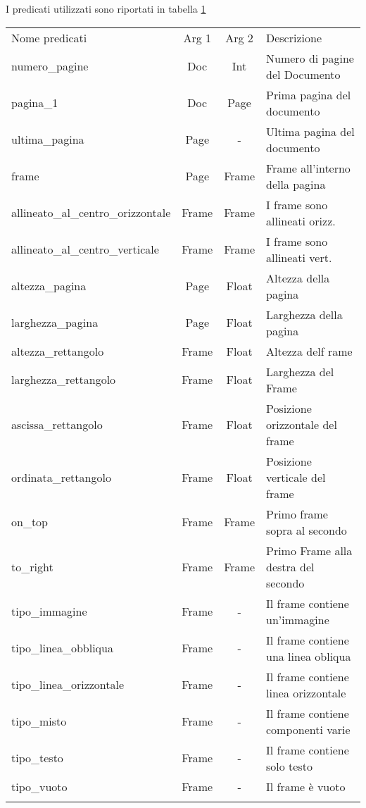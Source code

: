 I predicati utilizzati sono riportati in tabella \ref{tab:predicati}
\begin{table}[htbp]
\centering
\label{tab:predicati}
\footnotesize\begin{tabular}{lccl}
\toprule
\addlinespace
Nome predicati & Arg 1 & Arg 2 & Descrizione \\
\addlinespace
\midrule
\addlinespace
numero\_pagine & Doc & Int & Numero di pagine del Documento \\ 
pagina\_1 & Doc & Page & Prima pagina del documento \\ 
ultima\_pagina & Page & - & Ultima pagina del documento\\
frame & Page & Frame & Frame all'interno della pagina\\
allineato\_al\_centro\_orizzontale & Frame & Frame & I frame sono allineati orizz.\\
allineato\_al\_centro\_verticale & Frame & Frame & I frame sono allineati vert.\\
altezza\_pagina & Page & Float & Altezza della pagina\\
larghezza\_pagina & Page & Float & Larghezza della pagina\\
altezza\_rettangolo & Frame & Float & Altezza delf rame\\
larghezza\_rettangolo & Frame & Float & Larghezza del Frame\\
ascissa\_rettangolo & Frame & Float & Posizione orizzontale del frame\\
ordinata\_rettangolo & Frame & Float & Posizione verticale del frame\\
on\_top & Frame & Frame & Primo frame sopra al secondo\\
to\_right & Frame & Frame & Primo Frame alla destra del secondo\\
tipo\_immagine & Frame & - & Il frame contiene un'immagine\\
tipo\_linea\_obbliqua & Frame & - & Il frame contiene una linea obliqua\\
tipo\_linea\_orizzontale & Frame & - & Il frame contiene linea orizzontale\\
tipo\_misto & Frame & - & Il frame contiene componenti varie\\
tipo\_testo & Frame & - & Il frame contiene solo testo\\
tipo\_vuoto & Frame & - & Il frame è vuoto\\
\addlinespace
\bottomrule 
\end{tabular}
\end{table}

